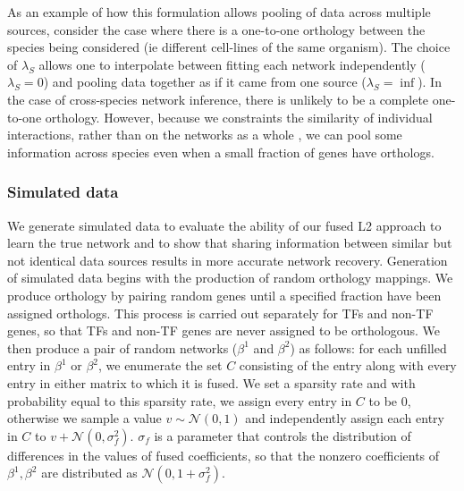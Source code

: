\documentclass[11pt]{article}
\begin{document}
As an example of how this formulation allows pooling of data across multiple sources, consider the case where there is a one-to-one orthology between the species being considered (ie different cell-lines of the same organism). The choice of $\lambda_S$ allows one to interpolate between fitting each network independently ($\lambda_S=0$) and pooling data together as if it came from one source ($\lambda_S=\inf$). In the case of cross-species network inference, there is unlikely to be a complete one-to-one orthology. However, because we  constraints the similarity of individual interactions, rather than on the networks as a whole \cite{parikh2011treegl,omranian2016gene}, we can pool some information across species even when a small fraction of genes have orthologs. 



\subsubsection{Simulated data}
We generate simulated data to evaluate the ability of our fused L2 approach to learn the true network and to show that sharing information between similar but not identical data sources results in more accurate network recovery. 
Generation of simulated data begins with the production of random orthology mappings. 
We produce orthology by pairing random genes until a specified fraction have been assigned orthologs. 
This process is carried out separately for TFs and non-TF genes, so that TFs and non-TF genes are never assigned to be orthologous. 
We then produce a pair of random networks ($\beta^1$ and $\beta^2$) as follows: for each unfilled entry in $\beta^1$ or $\beta^2$, we enumerate the set $C$ consisting of the entry along with every entry in either matrix to which it is fused. We set a sparsity rate and with probability equal to this sparsity rate, we assign every entry in $C$ to be 0, otherwise we sample a value $v \sim \mathcal{N}(0,1)$ and independently assign each entry in $C$ to $v + \mathcal{N}(0, \sigma_f^2)$. $\sigma_f$ is a parameter that controls the distribution of differences in the values of fused coefficients, so that the nonzero coefficients of $\beta^1, \beta^2$ are distributed as $\mathcal{N}(0, 1 + \sigma_f^2)$.
\end{document}
